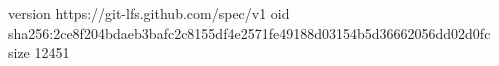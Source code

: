 version https://git-lfs.github.com/spec/v1
oid sha256:2ce8f204bdaeb3bafc2c8155df4e2571fe49188d03154b5d36662056dd02d0fc
size 12451
